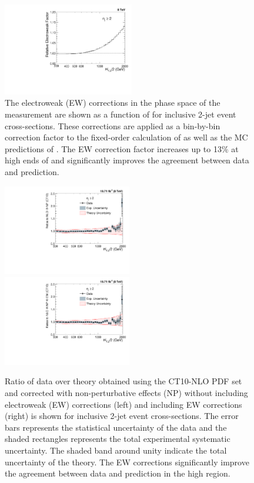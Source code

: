 \begin{figure}[!t]
 \begin{center}
 \includegraphics[width=0.51\textwidth]{Plots_HT_2_150/EW_2.pdf}
 \caption[]{The electroweak (EW) corrections \cite{Dittmaier:2012kx} in the phase space of the measurement are shown as a function of \httwo for inclusive 2-jet event cross-sections. These corrections are applied as a bin-by-bin correction factor to the fixed-order calculation of \NLOJETPP as well as the MC predictions of \MadGraphFn\plusn \PYTHIAS. The EW correction factor increases up to 13\% at high ends of \httwo and significantly improves the agreement between data and prediction.}
 \label{fig:EW}
 \end{center}
\end{figure}

\begin{figure}[!h]
 \begin{center}
 \hspace*{-5mm}\includegraphics[width=0.5\textwidth]{Plots_HT_2_150/Comparison_data_NLO_2_NoEW.pdf}
 ~~\includegraphics[width=0.5\textwidth]{Plots_HT_2_150/Comparison_data_NLO_2_EW.pdf}
 \caption[]{Ratio of data over theory obtained using the CT10-NLO PDF set and corrected with non-perturbative effects (NP) without including electroweak (EW) corrections (left) and including EW corrections (right) is shown for inclusive 2-jet event cross-sections. The error bars represents the statistical uncertainty of the data and the shaded rectangles represents the total experimental systematic uncertainty. The shaded band around unity indicate the total uncertainty of the theory. The EW corrections significantly improve the agreement between data and prediction in the high \httwo region.}
 \label{fig:EW_Comp}
 \end{center}
\end{figure}

